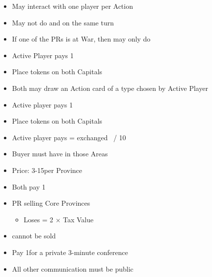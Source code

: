 \documentclass[10pt]{article}
\begin{document}
\begin{itemize}
	\item May interact with one player per Action
	\item May not do  and  on the same turn
	\item If one of the PRs is at War, then may only do 
\end{itemize}
\begin{itemize}
	\item Active Player pays 1\diplopower
	\item Place \marriage tokens on both Capitals
	\item Both may draw an Action card of a type chosen by Active Player
\end{itemize}
\begin{itemize}
	\item Active player pays 1\diplopower
	\item Place \alliance tokens on both Capitals
\end{itemize}
\begin{itemize}
	\item Active player pays \diplopower = exchanged \ducats~/ 10
\end{itemize}
\begin{itemize}
	\item Buyer must have \claim in those Areas
	\item Price: 3-15\ducats per Province
	\item Both pay 1\adminpower
	\item PR selling Core Provinces
	\begin{itemize}
		\item Loses \prestige = 2 × Tax Value
	\end{itemize}
	\item \vassals cannot be sold
\end{itemize}
\begin{itemize}
	\item Pay 1\diplopower for a private 3-minute conference
	\item All other communication must be public
\end{itemize}
\end{document}
